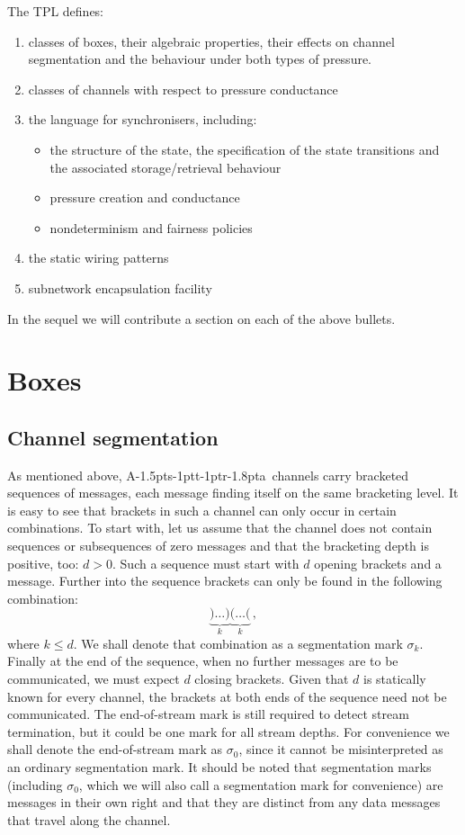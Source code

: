 \documentclass[11pt]{report}
\def\ak{{\textsf{A\kern-1.5pts\kern-1ptt\kern-1ptr\kern-1.8pta}}\kern-2pt{\it K\kern-2ptahn}}
\begin{document}
The TPL defines:
\begin{enumerate}
\item classes of boxes, their algebraic properties, their effects on channel segmentation and the behaviour under both types of pressure.
\item classes of channels with respect to pressure conductance
\item the language for synchronisers, including:
	\begin{itemize}
		\item the structure of the state, the specification of the state transitions and the associated storage/retrieval behaviour
		\item pressure creation and conductance
		\item nondeterminism and fairness policies
	\end{itemize}
\item the static wiring patterns
\item subnetwork encapsulation facility
\end{enumerate}

In the sequel we will contribute a section on each of the above bullets.

\section{Boxes}

\subsection{Channel segmentation}

As mentioned above, \ak\ channels carry bracketed sequences of messages, each message finding itself on the same bracketing level.
It is easy to see that brackets in such a channel can only occur in certain combinations. To start with, let us assume that the
channel does not contain sequences or subsequences of zero messages and that the bracketing depth is positive, too: $d>0$.
Such a sequence must start with $d$ opening brackets and a message. Further into the sequence brackets can only
be found in the following combination:
\[
\underbrace{)\ldots)}_k \underbrace{(\ldots(}_k\,,
\]
where $k\le d$. We shall denote that combination as a segmentation mark $\sigma_k$. Finally at the end of the sequence, when no further
messages are to be communicated, we must expect $d$ closing brackets. Given that $d$ is statically known for every channel, the
brackets at both ends of the sequence need not be communicated. The end-of-stream mark is still required to detect stream termination,
but it could be one mark for all stream depths. For convenience we shall denote the end-of-stream mark as $\sigma_0$, since it cannot be
misinterpreted as an ordinary segmentation mark. It should be noted that segmentation marks (including $\sigma_0$, which we will also call
a segmentation mark for convenience) are messages in their own right and that they are distinct from any data messages
that travel along the channel.
\end{document}
